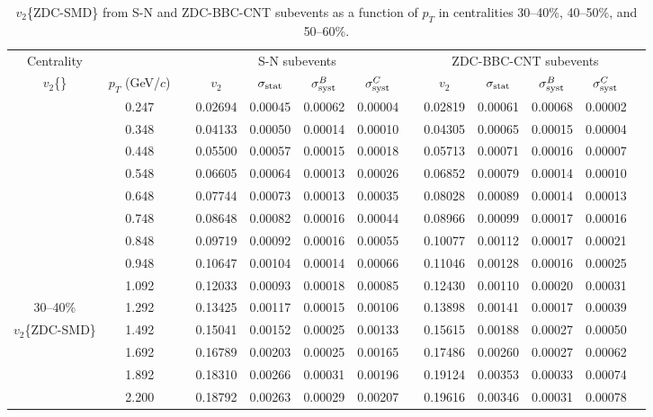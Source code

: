 \documentclass[aps,prc,superscriptaddress,showpacs,floatfix,twocolumn]{revtex4}
\newcommand \gevc{GeV/$c$\xspace}
\newcommand \pt{\mbox{$p_T$}\xspace}
\begin{document}
\begin{table}[htbp]
\caption{\label{tab:table_v2zdc_smd_cent30-60}
$v_2$\{ZDC-SMD\} from S-N and ZDC-BBC-CNT subevents as a function of \pt in centralities
30--40\%, 40--50\%, and 50--60\%.
}
\begingroup \squeezetable
\begin{ruledtabular} \begin{tabular}{c|cccccccccccc}
Centrality
 & & & \multicolumn{4}{c}{S-N subevents} & & \multicolumn{4}{c}{ZDC-BBC-CNT subevents} \\ 
$v_2$\{\}
 &$\pt$ (\gevc) & & $v_2$ & $\sigma_{\rm stat}$ & $\sigma_{\rm syst}^B$ & $\sigma_{\rm syst}^C$ 
& & $v_2$ & $\sigma_{\rm stat}$ & $\sigma_{\rm syst}^B$ & $\sigma_{\rm syst}^C$ \\ 
\hline
 & 0.247 && 0.02694 & 0.00045 & 0.00062 & 0.00004 & & 0.02819 & 0.00061 & 0.00068 & 0.00002 \\ 
 & 0.348 && 0.04133 & 0.00050 & 0.00014 & 0.00010 & & 0.04305 & 0.00065 & 0.00015 & 0.00004 \\ 
 & 0.448 && 0.05500 & 0.00057 & 0.00015 & 0.00018 & & 0.05713 & 0.00071 & 0.00016 & 0.00007 \\ 
 & 0.548 && 0.06605 & 0.00064 & 0.00013 & 0.00026 & & 0.06852 & 0.00079 & 0.00014 & 0.00010 \\ 
 & 0.648 && 0.07744 & 0.00073 & 0.00013 & 0.00035 & & 0.08028 & 0.00089 & 0.00014 & 0.00013 \\ 
 & 0.748 && 0.08648 & 0.00082 & 0.00016 & 0.00044 & & 0.08966 & 0.00099 & 0.00017 & 0.00016 \\ 
 & 0.848 && 0.09719 & 0.00092 & 0.00016 & 0.00055 & & 0.10077 & 0.00112 & 0.00017 & 0.00021 \\ 
 & 0.948 && 0.10647 & 0.00104 & 0.00014 & 0.00066 & & 0.11046 & 0.00128 & 0.00016 & 0.00025 \\ 
 & 1.092 && 0.12033 & 0.00093 & 0.00018 & 0.00085 & & 0.12430 & 0.00110 & 0.00020 & 0.00031 \\ 
30--40\%
 & 1.292 && 0.13425 & 0.00117 & 0.00015 & 0.00106 & & 0.13898 & 0.00141 & 0.00017 & 0.00039 \\ 
$v_2$\{ZDC-SMD\}
 & 1.492 && 0.15041 & 0.00152 & 0.00025 & 0.00133 & & 0.15615 & 0.00188 & 0.00027 & 0.00050 \\ 
 & 1.692 && 0.16789 & 0.00203 & 0.00025 & 0.00165 & & 0.17486 & 0.00260 & 0.00027 & 0.00062 \\ 
 & 1.892 && 0.18310 & 0.00266 & 0.00031 & 0.00196 & & 0.19124 & 0.00353 & 0.00033 & 0.00074 \\ 
 & 2.200 && 0.18792 & 0.00263 & 0.00029 & 0.00207 & & 0.19616 & 0.00346 & 0.00031 & 0.00078 \\ 

\end{tabular}
\end{ruledtabular}
\end{table}
\end{document}
